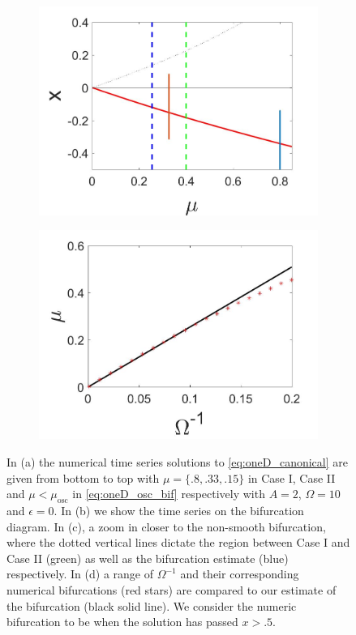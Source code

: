 \begin{figure}[H]
\begin{subfigure}{.5\textwidth}
 \includegraphics[width=\linewidth]{oneD/osc_bif_diagram_zoom.jpg}
 \caption{}
\end{subfigure}%
\begin{subfigure}{.5\textwidth}
\centering
\includegraphics[width=\linewidth]{oneD/osc_Omegacomp.jpg}
\caption{}
\label{fig:oneD_osc_comp}
\end{subfigure}
\caption{In (a) the numerical time series solutions to \eqref{eq:oneD_canonical} are given from bottom to top with $\mu=\{.8,.33,.15\}$ in Case I, Case II and $\mu<\mu_{\text{osc}}$ in \eqref{eq:oneD_osc_bif} respectively with $A=2$, $\Omega=10$ and $\epsilon=0$. In (b) we show the time series on the bifurcation diagram. In (c), a zoom in closer to the non-smooth bifurcation, where the dotted vertical lines dictate the region between Case I and Case II (green) as well as the bifurcation estimate (blue) respectively. In (d) a range of $\Omega^{-1}$ and their corresponding numerical bifurcations (red stars) are compared to our estimate of the bifurcation (black solid line). We consider the numeric bifurcation to be when the solution has passed $x>.5$.}
\label{fig:oneD_osc_numerics}
\end{figure}

